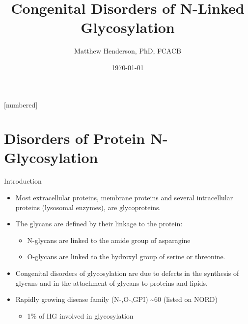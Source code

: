\documentclass[presentation, smaller]{beamer}
\author{Matthew Henderson, PhD, FCACB}
\date{\today}
\title{Congenital Disorders of N-Linked Glycosylation}
\institute[NSO]{Newborn Screening Ontario | The University of Ottawa}
\begin{document}
\maketitle


\vspace{220pt}
\beamertemplatenavigationsymbolsempty
{}[numbered]

\section{Disorders of Protein N-Glycosylation}
\label{sec:org4d58de1}
\begin{frame}[label={sec:org0bf6592}]{Introduction}
\begin{itemize}
\item Most extracellular proteins, membrane proteins and several
intracellular proteins (lysosomal enzymes), are glycoproteins.

\item The glycans are defined by their linkage to the protein:
\begin{itemize}
\item N-glycans are linked to the amide group of asparagine
\item O-glycans are linked to the hydroxyl group of serine or
threonine.
\end{itemize}

\item Congenital disorders of glycosylation are due to defects in the
synthesis of glycans and in the attachment of glycans to proteins
and lipids.
\item Rapidly growing disease family (N-,O-,GPI) \textasciitilde{}60 (listed on NORD)
\begin{itemize}
\item 1\% of HG involved in glycosylation
\end{itemize}
\end{itemize}
\end{frame}
\end{document}
